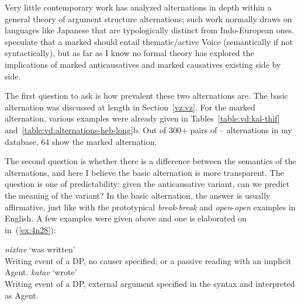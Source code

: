 \begin{exe}
\begin{xlist}
\begin{xlist}
\begin{exe}
\begin{exe}
\begin{xlist}
\begin{exe}
\begin{xlist}
\begin{exe}
\begin{xlist}
\begin{xlist}
\begin{exe}
\begin{xlist}
\begin{exe}
\begin{xlist}
\begin{exe}
\begin{xlist}
\begin{exe}
\begin{exe}
\begin{exe}
\begin{xlist}
\begin{exe}
\begin{exe}
\begin{xlist}
\begin{xlist}
\begin{exe}
\begin{xlist}
\begin{exe}
\begin{exe}
\begin{xlist}
\begin{exe}
\begin{exe}
\begin{xlist}
\begin{exe}
\begin{xlist}
\begin{exe}
\begin{xlist}
\begin{exe}
\begin{xlist}
\begin{exe}
Very little contemporary work has analyzed  alternations in depth within a general theory of argument structure alternations; such work normally draws on languages like Japanese \citep{jacobsen92} that are typologically distinct from Indo-European ones. \citet[62ff]{layering15} speculate that a marked  should entail thematic/active Voice (semantically if not syntactically), but as far as I know no formal theory has explored the implications of marked anticausatives and marked causatives existing side by side.

The first question to ask is how prevalent these two alternations are. The basic alternation was discussed at length in Section~\ref{vz:vz}. For the marked alternation, various examples were already given in Tables~\ref{table:vd:kal-thif} and~\ref{table:vd:alternations-heb-long}b. Out of 300+ pairs of {\tkal}--{\thif} alternations in my database, 64 show the marked alternation.\largerpage[-1]

The second question is whether there is a difference between the semantics of the alternations, and here I believe the basic alternation is more transparent. The question is one of predictability: given the anticausative variant, can we predict the meaning of the  variant? In the basic alternation, the answer is usually affirmative, just like with the prototypical \emph{break}-\emph{break} and \emph{open}-\emph{open} examples in English. A few examples were given  above and one is elaborated on in~(\ref{ex:4n28}):
 \begin{exe}
 \ex  \label{ex:4n28}
 \begin{xlist} 
 	\ex  \emph{nixtav} `was written' \\
		Writing event of a DP, no causer specified; or a passive reading with an implicit Agent.
 	\ex  \emph{katav} `wrote' \\
		Writing event of a DP, external argument specified in the syntax and interpreted as Agent.
 \z
\z 


\end{xlist}
\end{exe}
\end{exe}
\end{xlist}
\end{exe}
\end{xlist}
\end{exe}
\end{xlist}
\end{exe}
\end{xlist}
\end{exe}
\end{exe}
\end{xlist}
\end{exe}
\end{exe}
\end{xlist}
\end{exe}
\end{xlist}
\end{xlist}
\end{exe}
\end{exe}
\end{xlist}
\end{exe}
\end{exe}
\end{exe}
\end{xlist}
\end{exe}
\end{xlist}
\end{exe}
\end{xlist}
\end{exe}
\end{xlist}
\end{xlist}
\end{exe}
\end{xlist}
\end{exe}
\end{xlist}
\end{exe}
\end{exe}
\end{xlist}
\end{xlist}
\end{exe}
